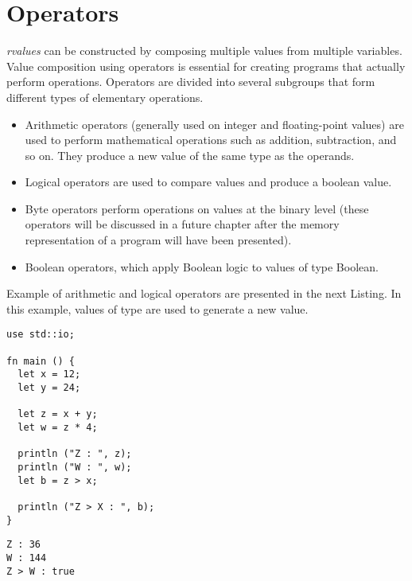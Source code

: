 \vspace{-5pt}%
\section{Operators}

\textit{rvalues} can be constructed by composing multiple values from multiple
variables. Value composition using operators is essential for creating programs
that actually perform operations. Operators are divided into several subgroups
that form different types of elementary operations.

\vspace{-5pt}%
\begin{itemize}
  \setlength\itemsep{-4pt}
\item Arithmetic operators (generally used on integer and floating-point values) are used to perform mathematical operations such as addition, subtraction, and so on. They produce a new value of the same type as the operands.
\item Logical operators are used to compare values and produce a boolean value.
\item Byte operators perform operations on values at the binary level (these operators will be discussed in a future chapter after the memory representation of a program will have been presented).
\item Boolean operators, which apply Boolean logic to values of type Boolean.
\end{itemize}

Example of arithmetic and logical operators are presented in the next Listing.
In this example, values of type  are used to generate a new value.

\begin{lstlisting}[style=coloredverbatim, label=lst:(chap2):operator_example, caption=Example of basic operators on \token{i32} values]
use std::io;

fn main () {
  let x = 12;
  let y = 24;

  let z = x + y;
  let w = z * 4;

  println ("Z : ", z);
  println ("W : ", w);
  let b = z > x;

  println ("Z > X : ", b);
}
\end{lstlisting}
\vspace{-10pt}%
\begin{lstlisting}[style=bashVerb, label=lst:(chap2):operator_example_output]
Z : 36
W : 144
Z > W : true
\end{lstlisting}


